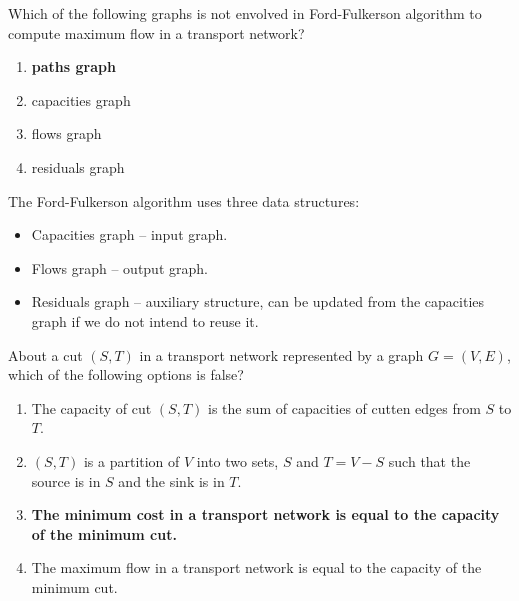 \documentclass{cal}
\begin{document}
{\begin{center}
\end{center}

Which of the following graphs is not envolved in Ford-Fulkerson algorithm to compute maximum flow in a transport network?
\begin{enumerate}[label=\Alph*)]\itemsep0em
    \item \textbf{paths graph \greencheckmark}
    \item capacities graph
    \item flows graph
    \item residuals graph
\end{enumerate}

\ansseparator

The Ford-Fulkerson algorithm uses three data structures:
\begin{itemize}
    \item Capacities graph -- input graph.
    \item Flows graph -- output graph.
    \item Residuals graph -- auxiliary structure, can be updated from the capacities graph if we do not intend to reuse it.
\end{itemize}

About a cut $(S, T)$ in a transport network represented by a graph $G=(V,E)$, which of the following options is false?
\begin{enumerate}[label=\Alph*)]\itemsep0em
    \item \label{itm:2019N-P1-14-A} The capacity of cut $(S,T)$ is the sum of capacities of cutten edges from $S$ to $T$.
    \item \label{itm:2019N-P1-14-B} $(S,T)$ is a partition of $V$ into two sets, $S$ and $T=V-S$ such that the source is in $S$ and the sink is in $T$.
    \item \label{itm:2019N-P1-14-C} \label{itm:2019N-P1-14-correct} \textbf{The minimum cost in a transport network is equal to the capacity of the minimum cut. \greencheckmark}
    \item \label{itm:2019N-P1-14-D} The maximum flow in a transport network is equal to the capacity of the minimum cut.
\end{enumerate}

}
\end{document}
